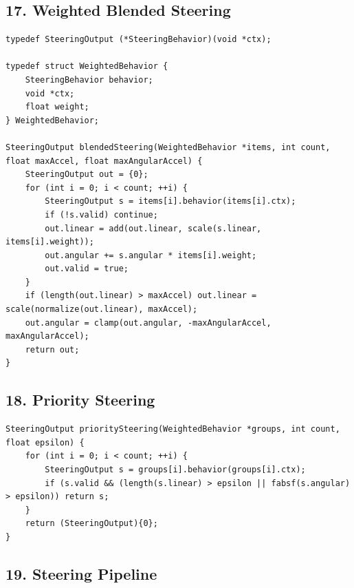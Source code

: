 \documentclass[10pt,letterpaper]{article}
\begin{document}
\subsection*{17. Weighted Blended Steering}
{}

\begin{verbatim}
typedef SteeringOutput (*SteeringBehavior)(void *ctx);

typedef struct WeightedBehavior {
    SteeringBehavior behavior;
    void *ctx;
    float weight;
} WeightedBehavior;

SteeringOutput blendedSteering(WeightedBehavior *items, int count, float maxAccel, float maxAngularAccel) {
    SteeringOutput out = {0};
    for (int i = 0; i < count; ++i) {
        SteeringOutput s = items[i].behavior(items[i].ctx);
        if (!s.valid) continue;
        out.linear = add(out.linear, scale(s.linear, items[i].weight));
        out.angular += s.angular * items[i].weight;
        out.valid = true;
    }
    if (length(out.linear) > maxAccel) out.linear = scale(normalize(out.linear), maxAccel);
    out.angular = clamp(out.angular, -maxAngularAccel, maxAngularAccel);
    return out;
}
\end{verbatim}

\subsection*{18. Priority Steering}
{}

\begin{verbatim}
SteeringOutput prioritySteering(WeightedBehavior *groups, int count, float epsilon) {
    for (int i = 0; i < count; ++i) {
        SteeringOutput s = groups[i].behavior(groups[i].ctx);
        if (s.valid && (length(s.linear) > epsilon || fabsf(s.angular) > epsilon)) return s;
    }
    return (SteeringOutput){0};
}
\end{verbatim}

\subsection*{19. Steering Pipeline}
{}
\end{document}
